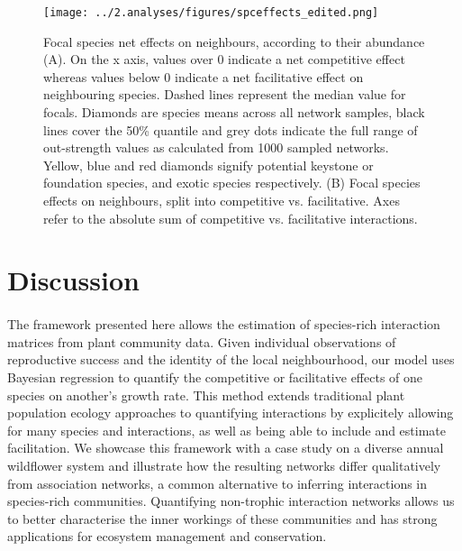 \documentclass[a4,12pt]{article}
\begin{document}

    \begin{figure}[H]
        \hspace*{-1cm}
        \texttt{[image: ../2.analyses/figures/spceffects\_edited.png]}
        \caption{Focal species net effects on neighbours, according to their abundance (A). On the x axis, values over 0 indicate a net competitive effect whereas values below 0 indicate a net facilitative effect on neighbouring species. Dashed lines represent the median value for focals. Diamonds are species means across all network samples, black lines cover the 50\% quantile and grey dots indicate the full range of out-strength values as calculated from 1000 sampled networks. Yellow, blue and red diamonds signify potential keystone or foundation species, and exotic species respectively. (B) Focal species effects on neighbours, split into competitive vs. facilitative. Axes refer to the absolute sum of competitive vs. facilitative interactions.}
        \label{fig:species}
    \end{figure} 


\section{Discussion}
    
    \paragraph{}
    The framework presented here allows the estimation of species-rich interaction matrices from plant community data. Given individual observations of reproductive success and the identity of the local neighbourhood, our model uses Bayesian regression to quantify the competitive or facilitative effects of one species on another's growth rate. This method extends traditional plant population ecology approaches to quantifying interactions by explicitely allowing for many species and interactions, as well as being able to include and estimate facilitation. We showcase this framework with a case study on a diverse annual wildflower system and illustrate how the resulting networks differ qualitatively from association networks, a common alternative to inferring interactions in species-rich communities. Quantifying non-trophic interaction networks allows us to better characterise the inner workings of these communities and has strong applications for ecosystem management and conservation. 
\end{document}
